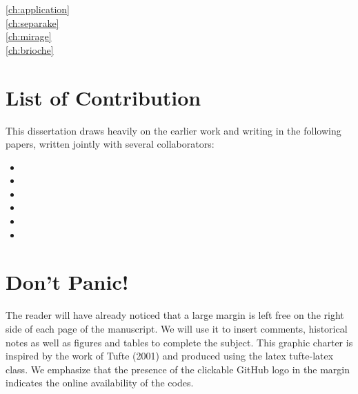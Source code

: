 \begin{description}
\item[\cref{ch:application}]\blindtext[1]
\item[\cref{ch:separake}]\blindtext[1]
\item[\cref{ch:mirage}]\blindtext[1]
\item[\cref{ch:brioche}]\blindtext[1]
\end{description}

\section{List of Contribution}
This dissertation draws heavily on the earlier work and writing in the following papers, written jointly with several collaborators:

\begin{itemize}
    \item {}
    \item {}
    \item {}
    \item {}
    \item {}
    \item {}
\end{itemize}


\section{Don't Panic!}
The reader will have already noticed that a large margin is left free on the right side of each page of the manuscript.
We will use it to insert comments, historical notes as well as figures and tables to complete the subject.
This graphic charter is inspired by the work of Tufte (2001) and produced using the latex tufte-latex class.
We emphasize that the presence of the clickable GitHub logo in the margin indicates the online availability of the codes.

